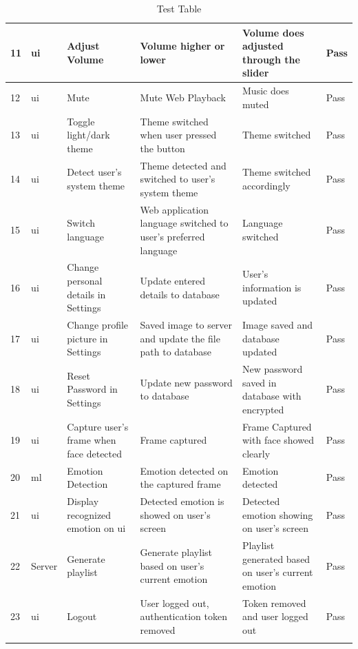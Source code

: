 \begin{landscape}
\begin{longtable}{ |m{1cm}|m{1.5cm}|m{5cm}|m{6cm}|m{6cm}|m{2cm}| }
    \hline
    11 & \gls{ui} & Adjust Volume & Volume higher or lower & Volume does adjusted through the slider & Pass \\
    \hline
    12 & \gls{ui} & Mute & Mute Web Playback & Music does muted & Pass \\
    \hline
    13 & \gls{ui} & Toggle light/dark theme & Theme switched when user pressed the button & Theme switched & Pass \\
    \hline
    14 & \gls{ui} & Detect user's system theme & Theme detected and switched to user's system theme & Theme switched accordingly & Pass \\
    \hline
    15 & \gls{ui} & Switch language & Web application language switched to user's preferred language & Language switched & Pass\\
    \hline
    16 & \gls{ui} & Change personal details in Settings & Update entered details to database & User's information is updated & Pass\\
    \hline
    17 & \gls{ui} & Change profile picture in Settings & Saved image to server and update the file path to database & Image saved and database updated & Pass\\
    \hline
    18 & \gls{ui} & Reset Password in Settings & Update new password to database & New password saved in database with encrypted & Pass \\
    \hline
    19 & \gls{ui} & Capture user's frame when face detected & Frame captured & Frame Captured with face showed clearly & Pass \\
    \hline
    20 & \gls{ml} & Emotion Detection & Emotion detected on the captured frame & Emotion detected & Pass \\
    \hline
    21 & \gls{ui} & Display recognized emotion on \gls{ui} & Detected emotion is showed on user's screen & Detected emotion showing on user's screen & Pass \\
    \hline
    22 & Server & Generate playlist & Generate playlist based on user's current emotion & Playlist generated based on user's current emotion & Pass \\
    \hline
    23 & \gls{ui} & Logout & User logged out, authentication token removed & Token removed and user logged out & Pass \\
    \hline
    \caption{Test Table}
\end{longtable}
\end{landscape}

